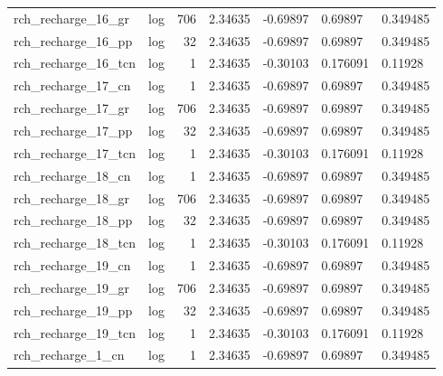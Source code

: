 \documentclass{article}
\begin{document}
\begin{center}
\begin{landscape}
\begin{longtable}{llrllll}
 rch\_recharge\_16\_gr &       log &    706 &        2.34635 &            -0.69897 &            0.69897 &           0.349485 \\
 rch\_recharge\_16\_pp &       log &     32 &        2.34635 &            -0.69897 &            0.69897 &           0.349485 \\
rch\_recharge\_16\_tcn &       log &      1 &        2.34635 &            -0.30103 &           0.176091 &            0.11928 \\
 rch\_recharge\_17\_cn &       log &      1 &        2.34635 &            -0.69897 &            0.69897 &           0.349485 \\
 rch\_recharge\_17\_gr &       log &    706 &        2.34635 &            -0.69897 &            0.69897 &           0.349485 \\
 rch\_recharge\_17\_pp &       log &     32 &        2.34635 &            -0.69897 &            0.69897 &           0.349485 \\
rch\_recharge\_17\_tcn &       log &      1 &        2.34635 &            -0.30103 &           0.176091 &            0.11928 \\
 rch\_recharge\_18\_cn &       log &      1 &        2.34635 &            -0.69897 &            0.69897 &           0.349485 \\
 rch\_recharge\_18\_gr &       log &    706 &        2.34635 &            -0.69897 &            0.69897 &           0.349485 \\
 rch\_recharge\_18\_pp &       log &     32 &        2.34635 &            -0.69897 &            0.69897 &           0.349485 \\
rch\_recharge\_18\_tcn &       log &      1 &        2.34635 &            -0.30103 &           0.176091 &            0.11928 \\
 rch\_recharge\_19\_cn &       log &      1 &        2.34635 &            -0.69897 &            0.69897 &           0.349485 \\
 rch\_recharge\_19\_gr &       log &    706 &        2.34635 &            -0.69897 &            0.69897 &           0.349485 \\
 rch\_recharge\_19\_pp &       log &     32 &        2.34635 &            -0.69897 &            0.69897 &           0.349485 \\
rch\_recharge\_19\_tcn &       log &      1 &        2.34635 &            -0.30103 &           0.176091 &            0.11928 \\
  rch\_recharge\_1\_cn &       log &      1 &        2.34635 &            -0.69897 &            0.69897 &           0.349485 \\

\end{longtable}
\end{landscape}
\end{center}
\end{document}
